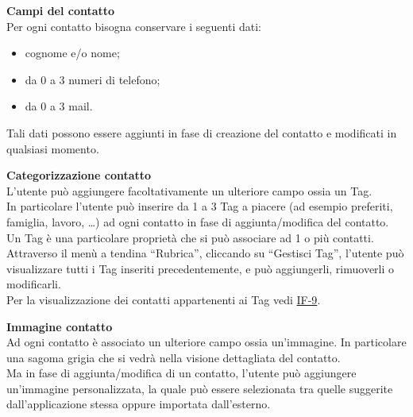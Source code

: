 \begin{tcolorbox}[colback=white,colframe=black!80!white,title=\textbf{Esigenze dei dati e informazioni DF}]
	\begin{itemize}[itemsep=2pt, topsep=0pt]
		\hypertarget{DF-1}{\item[\textbf{DF-1}]} \textbf{Campi del contatto}
		\\Per ogni contatto bisogna conservare i seguenti dati:
		\begin{itemize}[noitemsep, topsep=0pt, label=$\bullet$]
			\item cognome e/o nome;
			\item da 0 a 3 numeri di telefono;
			\item da 0 a 3 mail.
		\end{itemize}
		Tali dati possono essere aggiunti in fase di creazione del contatto e modificati in qualsiasi momento.
		
		\hypertarget{DF-2}{\item[\textbf{DF-2}]} \textbf{Categorizzazione contatto}
		\\L’utente può aggiungere facoltativamente un ulteriore campo ossia un Tag. 
		\\In particolare l’utente può inserire da 1 a 3 Tag a piacere (ad esempio preferiti, famiglia, lavoro, …) ad ogni contatto in fase di aggiunta/modifica del contatto.
		\\Un Tag è una particolare proprietà che si può associare ad 1 o più contatti.
		\\Attraverso il menù a tendina “Rubrica”, cliccando su “Gestisci Tag”,  l’utente può visualizzare tutti i Tag inseriti precedentemente, e può aggiungerli, rimuoverli o modificarli. 
		\\Per la visualizzazione dei contatti appartenenti ai Tag vedi \hyperlink{IF-9}{IF-9}.		
		
		\hypertarget{DF-3}{\item[\textbf{DF-3}]} \textbf{Immagine contatto}
		\\Ad ogni contatto è associato un ulteriore campo ossia un’immagine.
		In particolare una sagoma grigia che si vedrà nella visione dettagliata del contatto. 
		\\Ma in fase di aggiunta/modifica di un contatto, l’utente può aggiungere un’immagine personalizzata, la quale può essere selezionata tra quelle suggerite dall’applicazione stessa oppure importata dall’esterno.
		

\end{itemize}
\end{tcolorbox}
